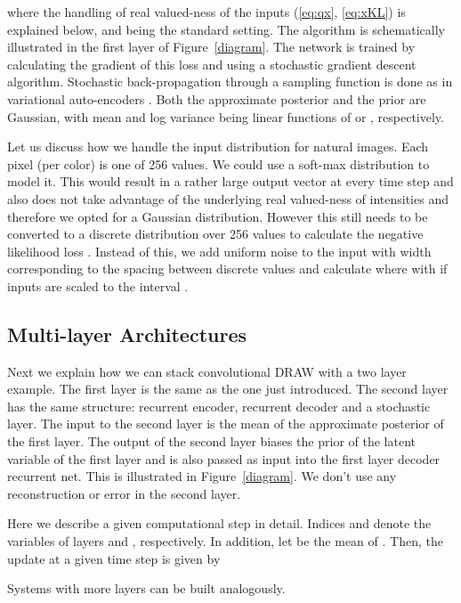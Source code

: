 \documentclass{article}
\begin{document}
where the handling of real valued-ness of the inputs (\ref{eq:qx}, \ref{eq:xKL}) is explained below, and  being the standard setting. The algorithm is schematically illustrated in the first layer of Figure~\ref{diagram}. The network is trained by calculating the gradient of this loss and using a stochastic gradient descent algorithm. Stochastic back-propagation through a sampling function is done as in variational auto-encoders \citep{kingma2013auto,rezende2014stochastic}. Both the approximate posterior  and the prior  are Gaussian, with mean and log variance being linear functions of  or , respectively. 

Let us discuss how we handle the input distribution for natural images. Each pixel (per color) is one of 256 values. We could use a soft-max distribution to model it. This would result in a rather large output vector at every time step and also does not take advantage of the underlying real valued-ness of intensities and therefore we opted for a Gaussian distribution. However this still needs to be converted to a discrete distribution over 256 values to calculate the negative likelihood loss . Instead of this, we add uniform noise to the input with width corresponding to the spacing between discrete values and calculate  where  with  if inputs are scaled to the interval .

\subsection{Multi-layer Architectures}

Next we explain how we can stack convolutional DRAW with a two layer example. The first layer is the same as the one just introduced. The second layer has the same structure: recurrent encoder, recurrent decoder and a stochastic layer. The input to the second layer is the mean  of the approximate posterior of the first layer. The output of the second layer biases the prior of the latent variable of the first layer and is also passed as input into the first layer decoder recurrent net. This is illustrated in Figure~\ref{diagram}. We don't use any reconstruction or error in the second layer. 

Here we describe a given computational step in detail. Indices  and  denote the variables of layers  and , respectively. In addition, let  be the mean of . Then, the update at a given time step is given by

Systems with more layers can be built analogously. 
\end{document}
